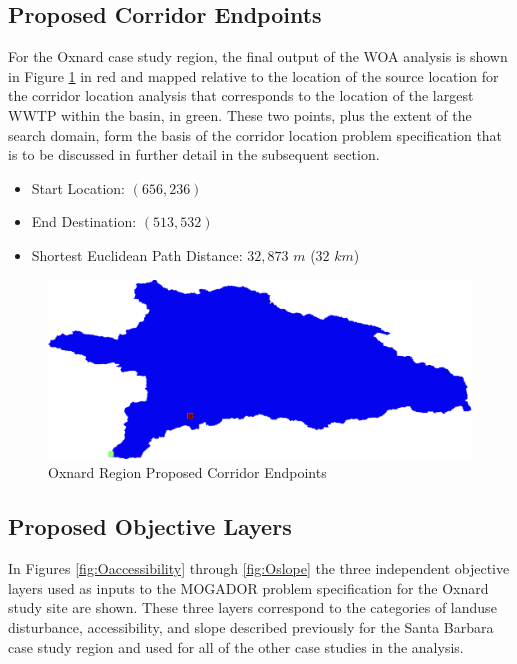     \subsection{Proposed Corridor Endpoints}
    
    For the Oxnard case study region, the final output of the WOA analysis is shown in Figure \ref{fig:Oendpoints} in red and mapped relative to the location of the source location for the corridor location analysis that corresponds to the location of the largest WWTP within the basin, in green. These two points, plus the extent of the search domain, form the basis of the corridor location problem specification that is to be discussed in further detail in the subsequent section. 
    
    \begin{itemize}
      \setlength{\itemsep}{0cm}
      \setlength{\parskip}{0cm}
        \item Start Location: $(656,236)$
        \item End Destination: $(513,532)$
        \item Shortest Euclidean Path Distance: $32,873$ $m$ ($32$ $km$)
    \end{itemize}
    
        \begin{figure}[!h]
            \begin{center}
            \includegraphics[width=5.5in]{figures/Oxnard_Endpoints.png}   
            \caption{Oxnard Region Proposed Corridor Endpoints}
            \label{fig:Oendpoints}
            \end{center}
        \end{figure}
            
    \subsection{Proposed Objective Layers}
    
In Figures \ref{fig:Oaccessibility} through \ref{fig:Oslope} the three independent objective layers used as inputs to the MOGADOR problem specification for the Oxnard study site are shown. These three layers correspond to the categories of landuse disturbance, accessibility, and slope described previously for the Santa Barbara case study region and used for all of the other case studies in the analysis. 

